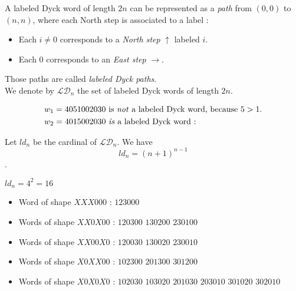 A labeled Dyck word of length $2n$ can be represented
as a \emph{path} from $(0,0)$ to $(n,n)$, where each North
step is associated to a label :
\begin{itemize}
    \item Each $i \neq 0$ corresponds to a
        \emph{North step} $\uparrow$ labeled $i$.
    \item Each $0$ corresponds to an
        \emph{East step} $\rightarrow$.
\end{itemize}
Those paths are called \emph{labeled Dyck paths}.\\
We denote by $\mathcal{LD}_n$ the set of labeled
Dyck words of length $2n$.

\begin{example}[$n = 5$]
    \begin{align*}
        &w_1 = 4051002030 \text{ is \emph{not} a labeled
            Dyck word, because }5 > 1.\\
        &w_2 = 4015002030 \text{ \emph{is} a labeled
            Dyck word :}\\
    \end{align*}
    
\end{example}

\begin{theorem}
    Let $ld_n$ be the cardinal of $\mathcal{LD}_n$.
    We have $$ld_n = (n + 1)^{n - 1}$$.
\end{theorem}

\begin{example}[$n = 3$]
    $ld_n = 4^2 = 16$
    \begin{itemize}
        \item Word of shape $XXX000$ :
            \subitem $123000$
        \item Words of shape $XX0X00$ :
            \subitem $120300$
            \hspace{2cm} $130200$
            \hspace{2cm} $230100$
        \item Words of shape $XX00X0$ :
            \subitem $120030$
            \hspace{2cm} $130020$
            \hspace{2cm} $230010$
        \item Words of shape $X0XX00$ :
            \subitem $102300$
            \hspace{2cm} $201300$
            \hspace{2cm} $301200$
        \item Words of shape $X0X0X0$ :
            \subitem $102030$
            \hspace{2cm} $103020$
            \hspace{2cm} $201030$
            \subitem $203010$
            \hspace{2cm} $301020$
            \hspace{2cm} $302010$
    \end{itemize}
    
\end{example}


